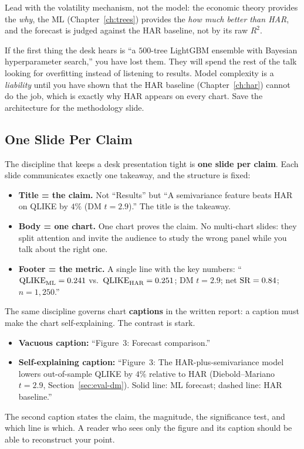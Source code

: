 \begin{keyidea}
Lead with the volatility mechanism, not the model: the economic theory provides the \emph{why}, the ML (Chapter~\ref{ch:trees}) provides the \emph{how much better than HAR}, and the forecast is judged against the HAR baseline, not by its raw $R^2$.
\end{keyidea}

\begin{warning}
If the first thing the desk hears is ``a $500$-tree LightGBM ensemble with Bayesian hyperparameter search,'' you have lost them. They will spend the rest of the talk looking for overfitting instead of listening to results. Model complexity is a \emph{liability} until you have shown that the HAR baseline (Chapter~\ref{ch:har}) cannot do the job, which is exactly why HAR appears on every chart. Save the architecture for the methodology slide.
\end{warning}

\subsection{One Slide Per Claim}
\label{subsec:one-slide}

The discipline that keeps a desk presentation tight is \textbf{one slide per claim}. Each slide communicates exactly one takeaway, and the structure is fixed:
\begin{itemize}[leftmargin=1.5em]
  \item \textbf{Title = the claim.} Not ``Results'' but ``A semivariance feature beats HAR on QLIKE by $4\%$ ($\text{DM } t = 2.9$).'' The title is the takeaway.
  \item \textbf{Body = one chart.} One chart proves the claim. No multi-chart slides: they split attention and invite the audience to study the wrong panel while you talk about the right one.
  \item \textbf{Footer = the metric.} A single line with the key numbers: ``$\operatorname{QLIKE}_{\text{ML}} = 0.241$ vs.\ $\operatorname{QLIKE}_{\text{HAR}} = 0.251$; DM $t = 2.9$; net $\operatorname{SR} = 0.84$; $n = 1{,}250$.''
\end{itemize}

The same discipline governs chart \textbf{captions} in the written report: a caption must make the chart self-explaining. The contrast is stark.
\begin{itemize}[leftmargin=1.5em]
  \item \textbf{Vacuous caption:} ``Figure~3: Forecast comparison.''
  \item \textbf{Self-explaining caption:} ``Figure~3: The HAR-plus-semivariance model lowers out-of-sample QLIKE by $4\%$ relative to HAR (Diebold--Mariano $t = 2.9$, Section~\ref{sec:eval-dm}). Solid line: ML forecast; dashed line: HAR baseline.''
\end{itemize}
The second caption states the claim, the magnitude, the significance test, and which line is which. A reader who sees only the figure and its caption should be able to reconstruct your point.

